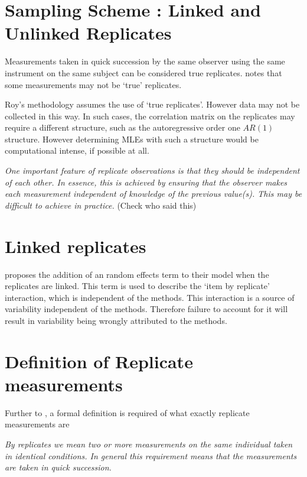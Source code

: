 \documentclass[12pt, a4paper]{report}
\theoremstyle{plain}
\theoremstyle{definition}
\theoremstyle{remark}
\begin{document}
	

	\section{Sampling Scheme : Linked and Unlinked Replicates}
	Measurements taken in quick succession by the same observer using the same instrument on the same subject can be considered true replicates. \citet{ARoy2009} notes that some measurements may not be `true' replicates.
	
	Roy's methodology assumes the use of `true replicates'. However data may not be collected in this way. In such cases, the correlation matrix on the replicates may require a different structure, such as the autoregressive order one $AR(1)$ structure. However determining MLEs with such a structure would be computational intense, if possible at all.
	
	\emph{
		One important feature of replicate observations is that they should be independent
		of each other. In essence, this is achieved by ensuring that the observer makes each
		measurement independent of knowledge of the previous value(s). This may be difficult
		to achieve in practice.} (Check who said this)
	
	\section{Linked replicates}
	
	\citet{BXC2008} proposes the addition of an random effects term to their model when the replicates are linked. This term is used to describe the `item by replicate' interaction, which is independent of the methods. This interaction is a source of variability independent of the methods. Therefore failure to account for it will result in variability being wrongly attributed to the methods.
	

	
	
	\section{Definition of Replicate measurements}
	Further to \citet{BA99}, a formal definition is required of what exactly replicate measurements are
	
	\emph{By replicates we mean two or more measurements on the same
		individual taken in identical conditions. In general this requirement means that the
		measurements are taken in quick succession.}
	
\end{document}
